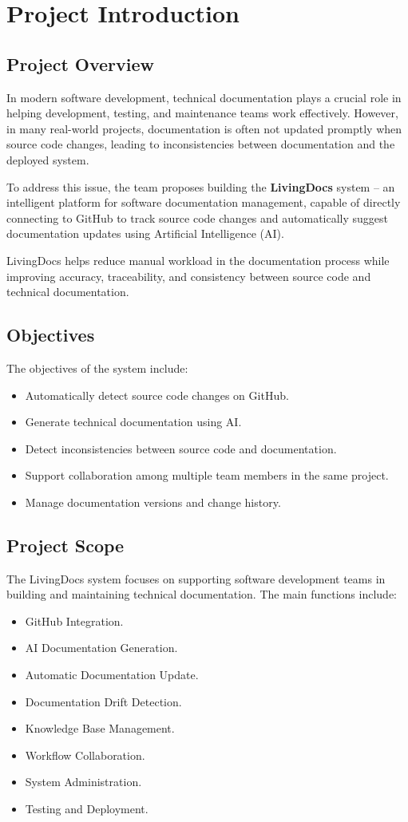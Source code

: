 \chapter{Project Introduction}

\section{Project Overview}
In modern software development, technical documentation plays a crucial role in helping development, testing, and maintenance teams work effectively. However, in many real-world projects, documentation is often not updated promptly when source code changes, leading to inconsistencies between documentation and the deployed system.

To address this issue, the team proposes building the \textbf{LivingDocs} system – an intelligent platform for software documentation management, capable of directly connecting to GitHub to track source code changes and automatically suggest documentation updates using Artificial Intelligence (AI).

LivingDocs helps reduce manual workload in the documentation process while improving accuracy, traceability, and consistency between source code and technical documentation.

\section{Objectives}
The objectives of the system include:
\begin{itemize}
    \item Automatically detect source code changes on GitHub.
    \item Generate technical documentation using AI.
    \item Detect inconsistencies between source code and documentation.
    \item Support collaboration among multiple team members in the same project.
    \item Manage documentation versions and change history.
\end{itemize}

\section{Project Scope}
The LivingDocs system focuses on supporting software development teams in building and maintaining technical documentation.  
The main functions include:
\begin{itemize}
    \item GitHub Integration.
    \item AI Documentation Generation.
    \item Automatic Documentation Update.
    \item Documentation Drift Detection.
    \item Knowledge Base Management.
    \item Workflow Collaboration.
    \item System Administration.
    \item Testing and Deployment.
\end{itemize}
